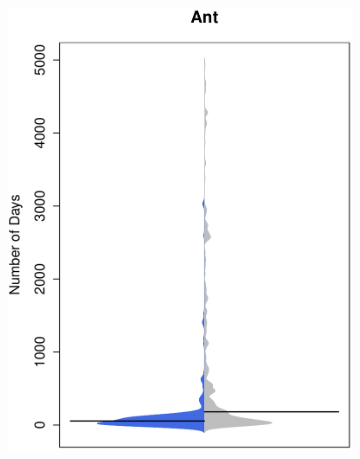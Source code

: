 \begin{figure}[t]
\begin{subfigure}[b]{0.20\textwidth}
		\includegraphics[width=\textwidth]{figures/test/camel_update.pdf}
		\label{fig:removal_comparison_hadoop}
	\end{subfigure}
  ~ 
  ~
  ~ 
	\begin{subfigure}[b]{0.20\textwidth}

\end{subfigure}
\end{figure}
